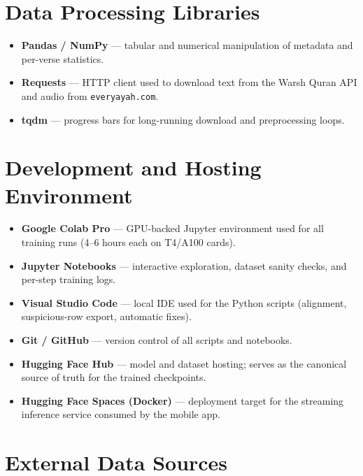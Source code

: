 \documentclass[12pt,a4paper]{report}
\begin{document}
\section{Data Processing Libraries}

\begin{itemize}[leftmargin=2em]
  \item \textbf{Pandas / NumPy} --- tabular and numerical manipulation
        of metadata and per-verse statistics.
  \item \textbf{Requests} --- HTTP client used to download text from the
        Warsh Quran API and audio from \texttt{everyayah.com}.
  \item \textbf{tqdm} --- progress bars for long-running download and
        preprocessing loops.
\end{itemize}

\section{Development and Hosting Environment}

\begin{itemize}[leftmargin=2em]
  \item \textbf{Google Colab Pro} --- GPU-backed Jupyter environment used
        for all training runs (4--6 hours each on T4/A100 cards).
  \item \textbf{Jupyter Notebooks} --- interactive exploration, dataset
        sanity checks, and per-step training logs.
  \item \textbf{Visual Studio Code} --- local IDE used for the Python
        scripts (alignment, suspicious-row export, automatic fixes).
  \item \textbf{Git / GitHub} --- version control of all scripts and
        notebooks.
  \item \textbf{Hugging Face Hub} --- model and dataset hosting; serves as
        the canonical source of truth for the trained checkpoints.
  \item \textbf{Hugging Face Spaces (Docker)} --- deployment target for
        the streaming inference service consumed by the mobile app.
\end{itemize}

\section{External Data Sources}
\end{document}
